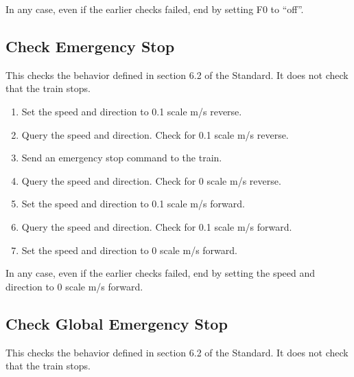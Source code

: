 In any case, even if the earlier checks failed, end by setting F0 to ``off''.

\subsection{Check Emergency Stop}

This checks the behavior defined in section 6.2 of the Standard.
It does not check that the train stops.

\begin{enumerate}

    \item Set the speed and direction to 0.1 scale m/s reverse.

    \item Query the speed and direction. Check for 0.1 scale m/s reverse.

    \item Send an emergency stop command to the train.

    \item Query the speed and direction. Check for 0 scale m/s reverse.

    \item Set the speed and direction to 0.1 scale m/s forward.

    \item Query the speed and direction. Check for 0.1 scale m/s forward.

    \item Set the speed and direction to 0 scale m/s forward.

\end{enumerate}

In any case, even if the earlier checks failed, end by setting the speed 
and direction to 0 scale m/s forward.

\subsection{Check Global Emergency Stop}

This checks the behavior defined in section 6.2 of the Standard.
It does not check that the train stops.

